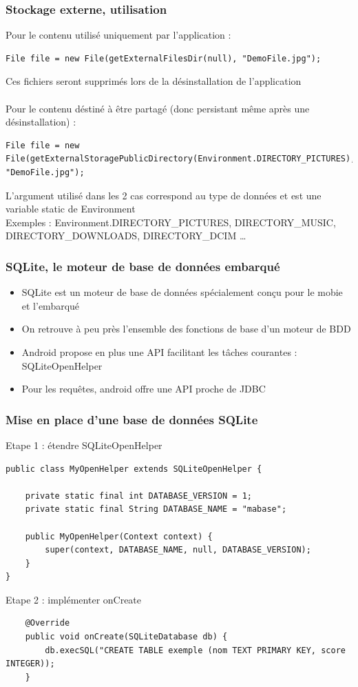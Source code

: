 \documentclass{beamer}
\begin{document}
\begin{frame}[fragile]
\frametitle{Stockage externe, utilisation}
Pour le contenu utilisé uniquement par l'application :
\begin{lstlisting}
File file = new File(getExternalFilesDir(null), "DemoFile.jpg");
\end{lstlisting}
Ces fichiers seront supprimés lors de la désinstallation de l'application\\\\
Pour le contenu déstiné à être partagé (donc persistant même après une désinstallation) : 
\begin{lstlisting}
File file = new File(getExternalStoragePublicDirectory(Environment.DIRECTORY_PICTURES), "DemoFile.jpg");
\end{lstlisting}
L'argument utilisé dans les 2 cas correspond au type de données et est une variable static de Environment\\
Exemples : Environment.DIRECTORY\_PICTURES, DIRECTORY\_MUSIC, DIRECTORY\_DOWNLOADS, DIRECTORY\_DCIM \ldots
\end{frame}
\begin{frame}[fragile]
\frametitle{SQLite, le moteur de base de données embarqué}
\begin{itemize}
    \item SQLite est un moteur de base de données spécialement conçu pour le mobie et l'embarqué
    \item On retrouve à peu près l'ensemble des fonctions de base d'un moteur de BDD
    \item Android propose en plus une API facilitant les tâches courantes : SQLiteOpenHelper
    \item Pour les requêtes, android offre une API proche de JDBC
\end{itemize}
\end{frame}
\begin{frame}[fragile]
\frametitle{Mise en place d'une base de données SQLite}
Etape 1 : étendre SQLiteOpenHelper 
\begin{lstlisting}
public class MyOpenHelper extends SQLiteOpenHelper {

    private static final int DATABASE_VERSION = 1;
    private static final String DATABASE_NAME = "mabase";

    public MyOpenHelper(Context context) {
        super(context, DATABASE_NAME, null, DATABASE_VERSION);
    }
}
\end{lstlisting}
Etape 2 : implémenter onCreate
\begin{lstlisting}
    @Override
    public void onCreate(SQLiteDatabase db) {
        db.execSQL("CREATE TABLE exemple (nom TEXT PRIMARY KEY, score INTEGER));
    }
\end{lstlisting}
\end{frame}
\end{document}
